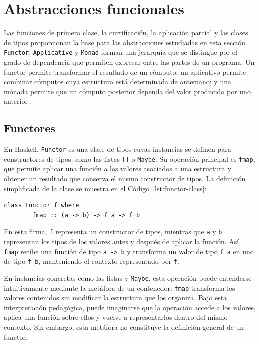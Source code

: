 
\section{Abstracciones funcionales}

Las funciones de primera clase, la currificación, la aplicación parcial y las clases de tipos proporcionan la base para las abstracciones estudiadas en esta sección. \texttt{Functor}, \texttt{Applicative} y \texttt{Monad} forman una jerarquía que se distingue por el grado de dependencia que permiten expresar entre las partes de un programa. Un functor permite transformar el resultado de un cómputo; un aplicativo permite combinar cómputos cuya estructura está determinada de antemano; y una mónada permite que un cómputo posterior dependa del valor producido por uno anterior \cite{Wadler1995,McBride2008,Yorgey2009}.

\subsection{Functores}

En \textsf{Haskell}, \texttt{Functor} es una clase de tipos cuyas instancias se definen para constructores de tipos, como las listas \verb|[]| o \verb|Maybe|. Su operación principal es \texttt{fmap}, que permite aplicar una función a los valores asociados a una estructura y obtener un resultado que conserva el mismo constructor de tipos. La definición simplificada de la clase se muestra en el Código~\ref{lst:functor-class}:

\begin{lstlisting}[style=haskell,caption={Definición simplificada de la clase \texttt{Functor}.},label={lst:functor-class}]
    class Functor f where
        fmap :: (a -> b) -> f a -> f b
\end{lstlisting}

En esta firma, \verb|f| representa un constructor de tipos, mientras que \verb|a| y \verb|b| representan los tipos de los valores antes y después de aplicar la función. Así, \texttt{fmap} recibe una función de tipo \verb|a -> b| y transforma un valor de tipo \verb|f a| en uno de tipo \verb|f b|, manteniendo el contexto representado por \verb|f|.

En instancias concretas como las listas y \verb|Maybe|, esta operación puede entenderse intuitivamente mediante la metáfora de un contenedor: \texttt{fmap} transforma los valores contenidos sin modificar la estructura que los organiza. Bajo esta interpretación pedagógica, puede imaginarse que la operación accede a los valores, aplica una función sobre ellos y vuelve a representarlos dentro del mismo contexto. Sin embargo, esta metáfora no constituye la definición general de un functor.

